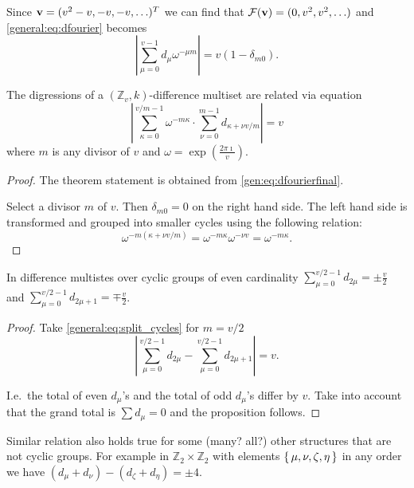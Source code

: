 Since ${\bf v} = (v^2-v, -v, -v, \ldots)^T$ we can find that $\mathcal{F}({\bf v}) = (0,v^2,v^2,\ldots)$ and \eqref{general:eq:dfourier} becomes
\begin{equation}
	\label{gen:eq:dfourierfinal}
	\left| \sum_{\mu=0}^{v-1} d_\mu \omega^{-\mu m} \right| = v (1-\delta_{m0}).
\end{equation}

\begin{theorem}
	\label{general:theorem:split_cycles}
	The digressions of a $(\mathbb Z_v, k)$-difference multiset are related via equation
	\begin{equation}
		\label{general:eq:split_cycles}
		\left| 
			\sum_{\kappa=0}^{v/m-1} \omega^{-m\kappa} \cdot 
			\sum_{\nu=0}^{m-1}  d_{\kappa+\nu v/m} 
		\right| = v
	\end{equation}
	where $m$ is any divisor of $v$ and $\omega = \exp(\frac{2\pi \imath}v)$.
\end{theorem}

\begin{proof}
	The theorem statement is obtained from \eqref{gen:eq:dfourierfinal}.
	
	Select a divisor $m$ of $v$. Then $\delta_{m0}=0$ on the right hand side. The left hand side is transformed and grouped into smaller cycles using the following relation:
	\begin{equation}
		\omega^{-m (\kappa+\nu v/m)}
		= \omega^{-m \kappa} \omega^{-\nu v}
		= \omega^{-m \kappa}.
	\end{equation}
\end{proof}

\begin{proposition}
	\label{general:theorem:even_cyclic}
	In difference multistes over cyclic groups of even cardinality $\sum_{\mu=0}^{v/2-1} d_{2\mu} = \pm \frac v2$ and $\sum_{\mu=0}^{v/2-1} d_{2\mu+1} = \mp \frac v2$.
\end{proposition}
\begin{proof}
	Take \eqref{general:eq:split_cycles} for $m=v/2$
	\begin{equation}
		\left| 
			\sum_{\mu=0}^{v/2-1} d_{2\mu} 
			- \sum_{\mu=0}^{v/2-1} d_{2\mu+1} 
		\right| = v.
	\end{equation}
	
	I.e.\ the total of even $d_\mu$'s and the total of odd $d_\mu$'s differ by $v$. Take into account that the grand total is $\sum d_\mu = 0$ and the proposition follows.
\end{proof}

\begin{remark}
	Similar relation also holds true for some (many? all?) other structures that are not cyclic groups. For example in $\mathbb Z_2 \times \mathbb Z_2$ with elements $\set{\mu, \nu, \zeta, \eta}$ in any order we have $(d_\mu+d_\nu)-(d_\zeta+d_\eta)=\pm 4$.
\end{remark}
